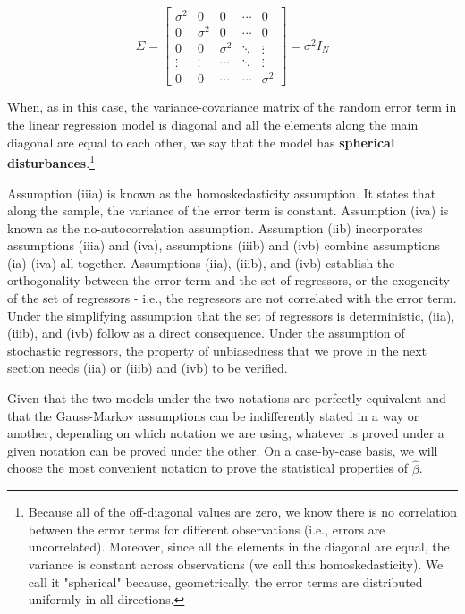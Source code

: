 $$
\Sigma = \left[
\begin{array}{ccccc}
\sigma^{2} & 0 & 0 & \cdots & 0 \\
0 & \sigma^{2} & 0 & \cdots & 0 \\
0 & 0 & \sigma^{2} & \ddots & \vdots \\
\vdots & \vdots & \cdots & \ddots & \vdots \\
0 & 0 & \cdots & \cdots & \sigma^{2}
\end{array}
\right] = \sigma^2 I_N
$$


When, as in this case, the variance-covariance matrix of the random error term in the linear regression model is diagonal and all the elements along the main diagonal are equal to each other, we say that the model has \textbf{spherical disturbances}.\footnote{Because all of the off-diagonal values are zero, we know there is no correlation between the error terms for different observations (i.e., errors are uncorrelated). Moreover, since all the elements in the diagonal are equal, the variance is constant across observations (we call this homoskedasticity). We call it "spherical" because, geometrically, the error terms are distributed uniformly in all directions.}

Assumption (iiia) is known as the homoskedasticity assumption. It states that along the sample, the variance of the error term is constant. Assumption (iva) is known as the no-autocorrelation assumption. Assumption (iib) incorporates assumptions (iiia) and (iva), assumptions (iiib) and (ivb) combine assumptions (ia)-(iva) all together. Assumptions (iia), (iiib), and (ivb) establish the orthogonality between the error term and the set of regressors, or the exogeneity of the set of regressors - i.e., the regressors are not correlated with the error term. Under the simplifying assumption that the set of regressors is deterministic, (iia), (iiib), and (ivb) follow as a direct consequence. Under the assumption of stochastic regressors, the property of unbiasedness that we prove in the next section needs (iia) or (iiib) and (ivb) to be verified.

Given that the two models under the two notations are perfectly equivalent and that the Gauss-Markov assumptions can be indifferently stated in a way or another, depending on which notation we are using, whatever is proved under a given notation can be proved under the other. On a case-by-case basis, we will choose the most convenient notation to prove the statistical properties of $\widehat{\beta}$.

